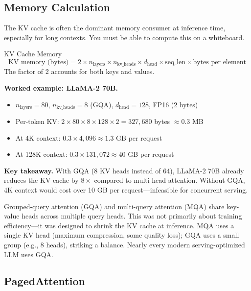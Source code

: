 \subsection{Memory Calculation}

The KV cache is often the dominant memory consumer at inference time, especially for long contexts. You must be able to compute this on a whiteboard.

\begin{mathresult}{KV Cache Memory}
\[
\text{KV memory (bytes)} = 2 \times n_{\text{layers}} \times n_{\text{kv\_heads}} \times d_{\text{head}} \times \text{seq\_len} \times \text{bytes per element}
\]
The factor of 2 accounts for both keys and values.
\end{mathresult}

\textbf{Worked example: LLaMA-2 70B.}
\begin{itemize}
    \item $n_{\text{layers}} = 80$, $n_{\text{kv\_heads}} = 8$ (GQA), $d_{\text{head}} = 128$, FP16 (2 bytes)
    \item Per-token KV: $2 \times 80 \times 8 \times 128 \times 2 = 327{,}680$ bytes $\approx 0.3$ MB
    \item At 4K context: $0.3 \times 4{,}096 \approx 1.3$ GB per request
    \item At 128K context: $0.3 \times 131{,}072 \approx 40$ GB per request
\end{itemize}

\textbf{Key takeaway.} With GQA (8 KV heads instead of 64), LLaMA-2 70B already reduces the KV cache by $8\times$ compared to multi-head attention. Without GQA, 4K context would cost over 10 GB per request---infeasible for concurrent serving.

\begin{keyinsight}
Grouped-query attention (GQA) and multi-query attention (MQA) share key-value heads across multiple query heads. This was not primarily about training efficiency---it was designed to shrink the KV cache at inference. MQA uses a single KV head (maximum compression, some quality loss); GQA uses a small group (e.g., 8 heads), striking a balance. Nearly every modern serving-optimized LLM uses GQA.
\end{keyinsight}

\subsection{PagedAttention}

